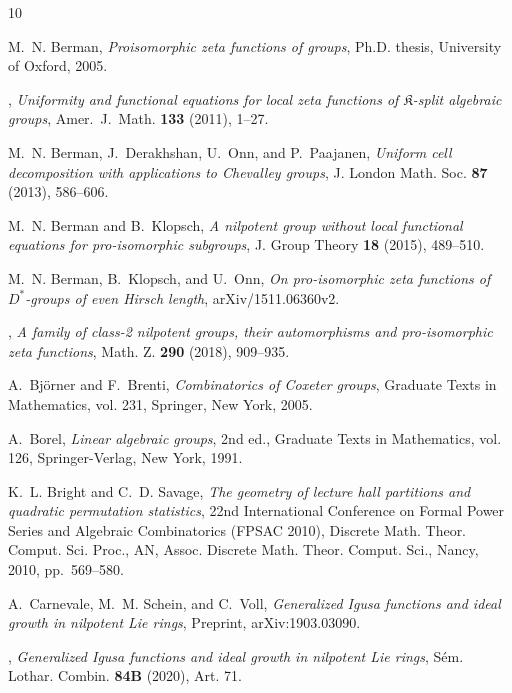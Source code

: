 \documentclass[11pt,a4paper]{amsart}
\theoremstyle{plain}
\theoremstyle{remark}
\begin{document}

\begin{thebibliography}{10}

M.~N. Berman, \emph{{Proisomorphic zeta functions of groups}}, Ph.D. thesis,
  University of Oxford, 2005.

\bysame, \emph{Uniformity and functional equations for local zeta functions of
  $\mathfrak{K}$-split algebraic groups}, Amer.\ {J}.\ {M}ath. \textbf{133}
  (2011), 1--27.

M.~N. Berman, J.~Derakhshan, U.~Onn, and P.~Paajanen, \emph{Uniform cell
  decomposition with applications to {C}hevalley groups}, J. London Math. Soc.
  \textbf{87} (2013), 586--606.

M.~N. Berman and B.~Klopsch, \emph{A nilpotent group without local functional
  equations for pro-isomorphic subgroups}, J. Group Theory \textbf{18} (2015),
  489--510.

M.~N. Berman, B.~Klopsch, and U.~Onn, \emph{On pro-isomorphic zeta functions of
  ${D}^\ast$-groups of even {H}irsch length}, arXiv/1511.06360v2.

\bysame, \emph{A family of class-2 nilpotent groups, their automorphisms and
  pro-isomorphic zeta functions}, Math. Z. \textbf{290} (2018), 909--935.

A.~Bj{\"o}rner and F.~Brenti, \emph{Combinatorics of {C}oxeter groups},
  Graduate Texts in Mathematics, vol. 231, Springer, New York, 2005.

A.~Borel, \emph{Linear algebraic groups}, 2nd ed., Graduate Texts in
  Mathematics, vol. 126, Springer-Verlag, New York, 1991.

K.~L. Bright and C.~D. Savage, \emph{The geometry of lecture hall partitions
  and quadratic permutation statistics}, 22nd {I}nternational {C}onference on
  {F}ormal {P}ower {S}eries and {A}lgebraic {C}ombinatorics ({FPSAC} 2010),
  Discrete Math. Theor. Comput. Sci. Proc., AN, Assoc. Discrete Math. Theor.
  Comput. Sci., Nancy, 2010, pp.~569--580.

A.~Carnevale, M.~M. Schein, and C.~Voll, \emph{{Generalized Igusa functions and
  ideal growth in nilpotent Lie rings}}, Preprint, arXiv:1903.03090.
  
\bysame, \emph{{Generalized Igusa functions and
  ideal growth in nilpotent Lie rings}}, S\'{e}m. Lothar. Combin. \textbf{84B} (2020), Art. 71.  


\end{thebibliography}
\end{document}
